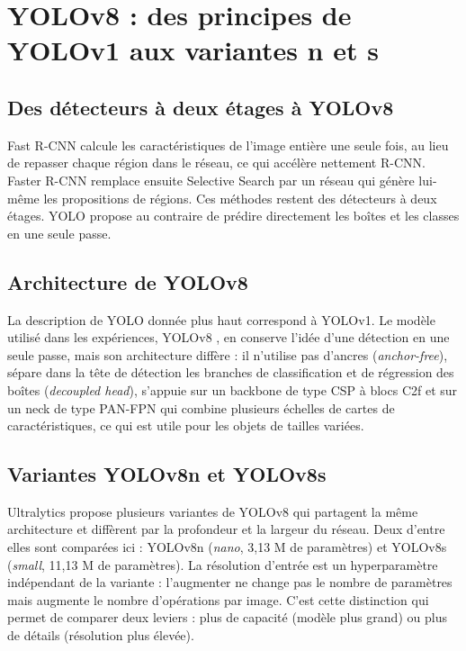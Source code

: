 \documentclass[11pt,a4paper]{article}
\begin{document}





\section{YOLOv8 : des principes de YOLOv1 aux variantes n et s}
\label{sec:yolov8}

\subsection{Des détecteurs à deux étages à YOLOv8}
Fast R-CNN \citep{girshick2015fast} calcule les caractéristiques de l'image
entière une seule fois, au lieu de repasser chaque région dans le réseau, ce
qui accélère nettement R-CNN. Faster R-CNN \citep{ren2015faster} remplace
ensuite Selective Search par un réseau qui génère lui-même les propositions
de régions. Ces méthodes restent des détecteurs à deux étages. YOLO
\citep{redmon2016yolo} propose au contraire de prédire directement les
boîtes et les classes en une seule passe.

\subsection{Architecture de YOLOv8}
La description de YOLO donnée plus haut correspond à YOLOv1. Le modèle
utilisé dans les expériences, YOLOv8 \citep{jocher2023ultralytics}, en
conserve l'idée d'une détection en une seule passe, mais son architecture
diffère : il n'utilise pas d'ancres (\emph{anchor-free}), sépare dans la
tête de détection les branches de classification et de régression des boîtes
(\emph{decoupled head}), s'appuie sur un backbone de type CSP à blocs C2f et
sur un neck de type PAN-FPN qui combine plusieurs échelles de cartes de
caractéristiques, ce qui est utile pour les objets de tailles variées.

\subsection{Variantes YOLOv8n et YOLOv8s}
Ultralytics propose plusieurs variantes de YOLOv8 qui partagent la même
architecture et diffèrent par la profondeur et la largeur du réseau. Deux
d'entre elles sont comparées ici : YOLOv8n (\emph{nano}, 3,13 M de
paramètres) et YOLOv8s (\emph{small}, 11,13 M de paramètres). La résolution
d'entrée est un hyperparamètre indépendant de la variante : l'augmenter ne
change pas le nombre de paramètres mais augmente le nombre d'opérations par
image. C'est cette distinction qui permet de comparer deux leviers : plus de
capacité (modèle plus grand) ou plus de détails (résolution plus élevée).
\end{document}
